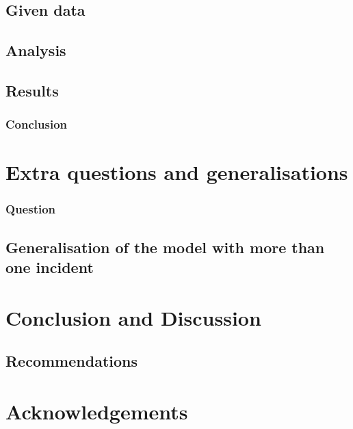 \documentclass[a4paper, twoside, 11pt]{report}
\theoremstyle{plain}
\theoremstyle{definition}
\theoremstyle{remark}
\begin{document}
\section{Given data}

\section{Analysis}

\section{Results}

\subsection{Conclusion}

\chapter{Extra questions and generalisations}

\subsection{Question} 

\section{Generalisation of the model with more than one incident}

\newpage




\chapter*{Conclusion and Discussion}


\section*{Recommendations}





\chapter*{Acknowledgements}


\clearpage

\thispagestyle{plain}

\cleardoublepage






%
%
\end{document}
